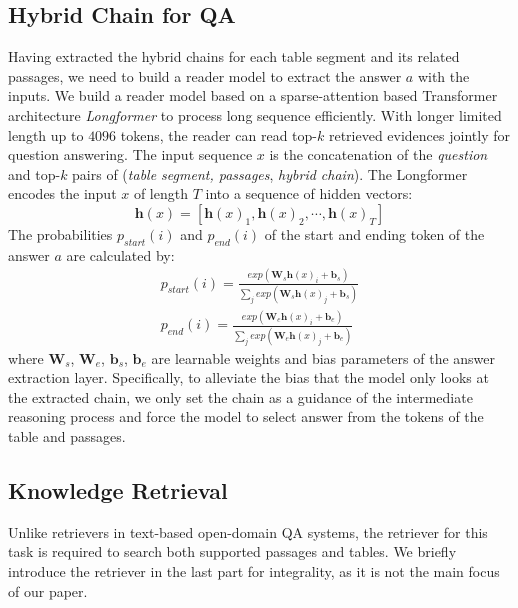 \documentclass[11pt]{article}
\begin{document}
	\subsection{Hybrid Chain for QA}
	\label{sec:qa}
	Having extracted the hybrid chains for each table segment and its related passages, we need to build a reader model to extract the answer $a$ with the inputs.
	We build a reader model based on a sparse-attention based Transformer architecture \textit{Longformer} \cite{beltagy2020longformer} to process long sequence efficiently.
	With longer limited length up to $4096$ tokens, the reader can read top-$k$ retrieved evidences jointly for question answering.
	The input sequence $x$ is the concatenation of the \textit{question} and top-$k$ pairs of (\textit{table segment, passages}, \textit{hybrid chain}).
	The Longformer encodes the input $x$ of length $T$ into a sequence of hidden vectors:
	\begin{equation}
		\bm{h}(x) =  [\bm{h}(x)_1,\bm{h}(x)_2,\cdots,\bm{h}(x)_T]
	\end{equation}
	The probabilities $p_{start}(i)$ and $p_{end}(i)$ of the start and ending token of the answer $a$ are calculated by:
	\begin{equation}
		\begin{aligned}
			p_{start}(i) = \frac{exp(\bm{W}_{s}\bm{h}(x)_i + \bm{b}_s)}{\sum_{j}exp(\bm{W}_{s}\bm{h}(x)_j + \bm{b}_s)} \\
			p_{end}(i) = \frac{exp(\bm{W}_{e}\bm{h}(x)_i + \bm{b}_e)}{\sum_{j}exp(\bm{W}_{e}\bm{h}(x)_j + \bm{b}_e)}
		\end{aligned}
	\end{equation}
	where $\bm{W}_{s}$, $\bm{W}_{e}$, $\bm{b}_s$, $\bm{b}_e$ are learnable weights and bias parameters of the answer extraction layer. 
	Specifically, to alleviate the bias that the model only looks at the extracted chain, we only set the chain as a guidance of the intermediate reasoning process and force the model to select answer from the tokens of the table and passages.
	\subsection{Knowledge Retrieval}
	\label{sec:retriever}
	Unlike retrievers in text-based open-domain QA systems, the retriever for this task is required to search both supported passages and tables. 
	We briefly introduce the retriever in the last part for integrality, as it is not the main focus of our paper. 
\end{document}
